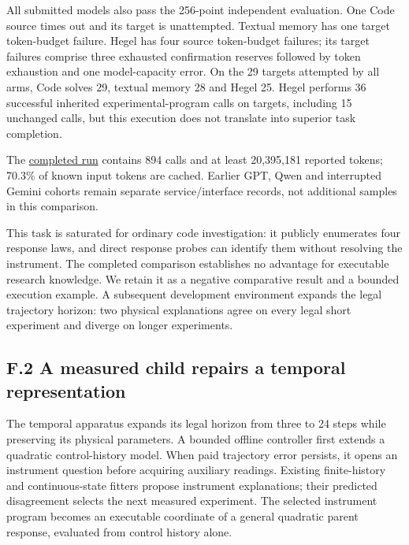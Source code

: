 \documentclass[twoside,11pt]{article}
\begin{document}
All submitted models also pass the 256-point independent evaluation. One Code
source times out and its target is unattempted. Textual memory has one target
token-budget failure. Hegel has four source token-budget failures; its target
failures comprise three exhausted confirmation reserves followed by token
exhaustion and one model-capacity error. On the 29 targets attempted by all arms,
Code solves 29, textual memory 28 and Hegel 25. Hegel performs 36 successful
inherited experimental-program calls on targets, including 15 unchanged calls,
but this execution does not translate into superior task completion.


The \hyperlink{artifact-53}{completed run}
contains 894 calls and at least 20,395,181 reported tokens; 70.3\% of known input
tokens are cached. Earlier GPT, Qwen and interrupted Gemini cohorts remain
separate service/interface records, not additional samples in this comparison.


This task is saturated for ordinary code investigation: it publicly enumerates
four response laws, and direct response probes can identify them without
resolving the instrument. The completed comparison establishes no advantage for
executable research knowledge. We retain it as a negative comparative result
and a bounded execution example. A subsequent development environment expands the
legal trajectory horizon: two physical explanations agree on every legal short
experiment and diverge on longer experiments.


\subsection*{F.2 A measured child repairs a temporal representation}

The temporal apparatus expands its legal horizon from three to 24 steps while
preserving its physical parameters. A bounded offline controller first extends
a quadratic control-history model. When paid trajectory error persists, it
opens an instrument question before acquiring auxiliary readings. Existing
finite-history and continuous-state fitters propose instrument explanations;
their predicted disagreement selects the next measured experiment. The selected
instrument program becomes an executable coordinate of a general quadratic
parent response, evaluated from control history alone.
\end{document}
